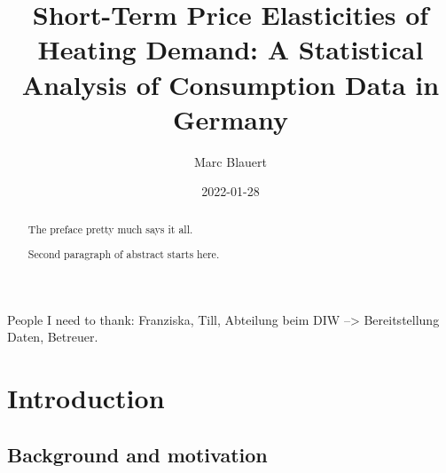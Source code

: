 \documentclass[12pt,twoside]{reedthesis}
\title{Short-Term Price Elasticities of Heating Demand: A Statistical Analysis of Consumption Data in Germany}
\author{Marc Blauert}
\date{2022-01-28}
\begin{document}
  \maketitle

\frontmatter %
\pagestyle{empty} %
  \begin{acknowledgements}
    People I need to thank: Franziska, Till, Abteilung beim DIW --\textgreater{} Bereitstellung Daten, Betreuer.
  \end{acknowledgements}

  \hypersetup{linkcolor=black}
  \setcounter{secnumdepth}{2}
  \setcounter{tocdepth}{2}
  \tableofcontents

  \listoftables

  \listoffigures
  \begin{abstract}
    The preface pretty much says it all.

    \par

    Second paragraph of abstract starts here.
  \end{abstract}

\mainmatter %
\pagestyle{fancyplain} %

\hypertarget{introduction}{%
\chapter{Introduction}\label{introduction}}

\hypertarget{background}{%
\section{Background and motivation}\label{background}}
\end{document}
